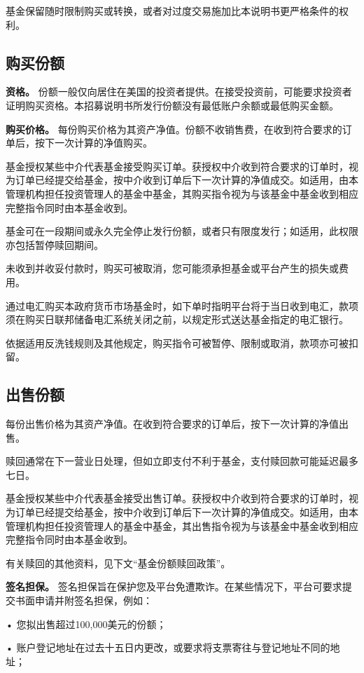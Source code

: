 \documentclass[UTF8,fontset=none,11pt,a4paper]{ctexart}
\begin{document}
基金保留随时限制购买或转换，或者对过度交易施加比本说明书更严格条件的权利。


\subsection*{购买份额}
\textbf{资格。} 份额一般仅向居住在美国的投资者提供。在接受投资前，可能要求投资者证明购买资格。本招募说明书所发行份额没有最低账户余额或最低购买金额。


\textbf{购买价格。} 每份购买价格为其资产净值。份额不收销售费，在收到符合要求的订单后，按下一次计算的净值购买。


基金授权某些中介代表基金接受购买订单。获授权中介收到符合要求的订单时，视为订单已经提交给基金，按中介收到订单后下一次计算的净值成交。如适用，由本管理机构担任投资管理人的基金中基金，其购买指令视为与该基金中基金收到相应完整指令同时由本基金收到。


基金可在一段期间或永久完全停止发行份额，或者只有限度发行；如适用，此权限亦包括暂停赎回期间。


未收到并收妥付款时，购买可被取消，您可能须承担基金或平台产生的损失或费用。


通过电汇购买本政府货币市场基金时，如下单时指明平台将于当日收到电汇，款项须在购买日联邦储备电汇系统关闭之前，以规定形式送达基金指定的电汇银行。


依据适用反洗钱规则及其他规定，购买指令可被暂停、限制或取消，款项亦可被扣留。


\subsection*{出售份额}
每份出售价格为其资产净值。在收到符合要求的订单后，按下一次计算的净值出售。


赎回通常在下一营业日处理，但如立即支付不利于基金，支付赎回款可能延迟最多七日。


基金授权某些中介代表基金接受出售订单。获授权中介收到符合要求的订单时，视为订单已经提交给基金，按中介收到订单后下一次计算的净值成交。如适用，由本管理机构担任投资管理人的基金中基金，其出售指令视为与该基金中基金收到相应完整指令同时由本基金收到。


有关赎回的其他资料，见下文“基金份额赎回政策”。


\textbf{签名担保。} 签名担保旨在保护您及平台免遭欺诈。在某些情况下，平台可要求提交书面申请并附签名担保，例如：


• 您拟出售超过100,000美元的份额；


• 账户登记地址在过去十五日内更改，或要求将支票寄往与登记地址不同的地址；
\end{document}
